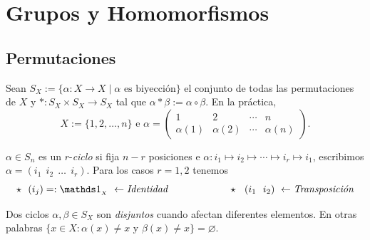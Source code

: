 \section{Grupos y Homomorfismos}

\newcommand{\comentario}[1]{\textcolor{gray}{\(\rightarrow \) #1}}
\subsection*{Permutaciones}
\begin{definition}
    Sean \(S_X:= \{\alpha: X \to X \mid \alpha \text{ es biyección}\}\) el conjunto de todas las permutaciones de \(X\) y \(*: S_X \times S_X \to S_X\) tal que \(\alpha * \beta := \alpha \circ \beta\).  En la práctica,   
    \[ X := \{1, 2, \ldots, n\}\text{ \  e \ } \alpha =  \begin{pmatrix}
        1 & 2 & \cdots & n \\ 
        \alpha(1) & \alpha(2) & \cdots & \alpha(n)
    \end{pmatrix}.\]
\end{definition}
\vspace{-0.7cm}
\begin{definition}
    \(\alpha  \in S_n\) es un $r$-\emph{ciclo} si fija \(n-r\) posiciones e \(\alpha :  i_1 \mapsto i_2 \mapsto \cdots \mapsto i_r \mapsto i_1\), escribimos \(\alpha = (i_1 \ \  i_2 \ \  \ldots \ \  i_r)\). Para los casos \(r=1, 2\) tenemos
    \[\star \ \  (i_j) =: \id_{_X} \  \leftarrow \text{\emph{Identidad} } \hspace{2cm}\star \ \ (i_1 \ \ i_2) \ \leftarrow \text{\emph{Transposición}}\]
\end{definition}


\begin{definition}
    Dos ciclos \(\alpha, \beta \in S_X\) son \emph{disjuntos} cuando afectan diferentes elementos. En otras palabras \(\{x \in X : \alpha (x) \neq x  \text{ \ y \ } \beta(x)\neq x\}= \varnothing\). %
\end{definition}

